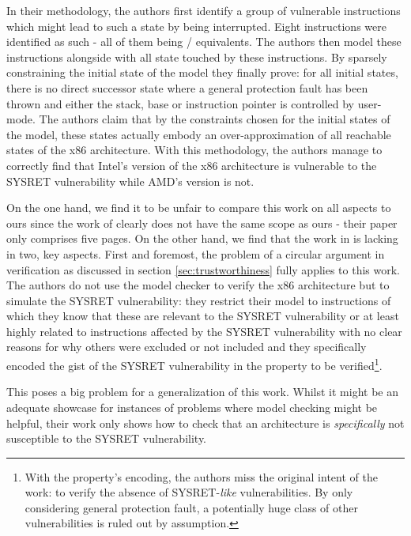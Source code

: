 In their methodology, the authors first identify a group of vulnerable instructions which might lead to such a state by being interrupted.
Eight instructions were identified as such - all of them being / equivalents.
The authors then model these instructions alongside with all state touched by these instructions.
By sparsely constraining the initial state of the model they finally prove: for all initial states, there is no direct successor state where a general protection fault has been thrown and either the stack, base or instruction pointer is controlled by user-mode.
The authors claim that by the constraints chosen for the initial states of the model, these states actually embody an over-approximation of all reachable states of the x86 architecture.
With this methodology, the authors manage to correctly find that Intel's version of the x86 architecture is vulnerable to the SYSRET vulnerability while AMD's version is not.

On the one hand, we find it to be unfair to compare this work on all aspects to ours since the work of \citeauthor{BradfieldS16} clearly does not have the same scope as ours - their paper only comprises five pages.
On the other hand, we find that the work in \cite{BradfieldS16} is lacking in two, key aspects.
First and foremost, the problem of a circular argument in verification as discussed in section \ref{sec:trustworthiness} fully applies to this work.
The authors do not use the model checker to verify the x86 architecture but to simulate the SYSRET vulnerability: they restrict their model to instructions of which they know that these are relevant to the SYSRET vulnerability or at least highly related to instructions affected by the SYSRET vulnerability with no clear reasons for why others were excluded or not included and they specifically encoded the gist of the SYSRET vulnerability in the property to be verified\footnote{%
    With the property's encoding, the authors miss the original intent of the work: to verify the absence of SYSRET-\textit{like} vulnerabilities.
    By only considering general protection fault, a potentially huge class of other vulnerabilities is ruled out by assumption.
}.

This poses a big problem for a generalization of this work.
Whilst it might be an adequate showcase for instances of problems where model checking might be helpful, their work only shows how to check that an architecture is \textit{specifically} not susceptible to the SYSRET vulnerability.

